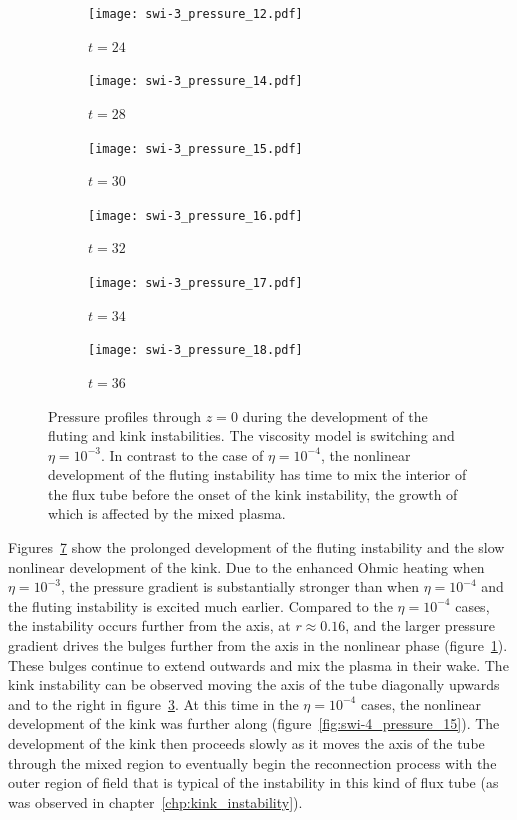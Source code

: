 \begin{figure}[t]
  \centering
    \begin{subfigure}{0.32\textwidth}
      \texttt{[image: swi-3\_pressure\_12.pdf]}
      \caption{$t=24$}
      \label{fig:swi-3_pressure_12}
    \end{subfigure}
    \hfill
    \begin{subfigure}{0.32\textwidth}
      \texttt{[image: swi-3\_pressure\_14.pdf]}
      \caption{$t=28$}
      \label{fig:swi-3_pressure_14}
    \end{subfigure}
    \hfill
    \begin{subfigure}{0.32\textwidth}
      \texttt{[image: swi-3\_pressure\_15.pdf]}
      \caption{$t=30$}
      \label{fig:swi-3_pressure_15}
    \end{subfigure}
    \hfill
    \begin{subfigure}{0.32\textwidth}
      \texttt{[image: swi-3\_pressure\_16.pdf]}
      \caption{$t=32$}
      \label{fig:swi-3_pressure_16}
    \end{subfigure}
    \hfill
    \begin{subfigure}{0.32\textwidth}
      \texttt{[image: swi-3\_pressure\_17.pdf]}
      \caption{$t=34$}
      \label{fig:swi-3_pressure_17}
    \end{subfigure}
    \hfill
    \begin{subfigure}{0.32\textwidth}
      \texttt{[image: swi-3\_pressure\_18.pdf]}
      \caption{$t=36$}
      \label{fig:swi-3_pressure_18}
    \end{subfigure}
\caption{Pressure profiles through $z=0$ during the development of the fluting and kink instabilities. The viscosity model is switching and $\eta = 10^{-3}$. In contrast to the case of $\eta=10^{-4}$, the nonlinear development of the fluting instability has time to mix the interior of the flux tube before the onset of the kink instability, the growth of which is affected by the mixed plasma.}
\label{fig:kink_pressure_slices-3}%
\end{figure}

Figures~\ref{fig:kink_pressure_slices-3} show the prolonged development of the fluting instability and the slow nonlinear development of the kink. Due to the enhanced Ohmic heating when $\eta=10^{-3}$, the pressure gradient is substantially stronger than when $\eta=10^{-4}$ and the fluting instability is excited much earlier. Compared to the $\eta=10^{-4}$ cases, the instability occurs further from the axis, at $r\approx0.16$, and the larger pressure gradient drives the bulges further from the axis in the nonlinear phase (figure~\ref{fig:swi-3_pressure_12}). These bulges continue to extend outwards and mix the plasma in their wake. The kink instability can be observed moving the axis of the tube diagonally upwards and to the right in figure~\ref{fig:swi-3_pressure_15}. At this time in the $\eta=10^{-4}$ cases, the nonlinear development of the kink was further along (figure~\ref{fig:swi-4_pressure_15}). The development of the kink then proceeds slowly as it moves the axis of the tube through the mixed region to eventually begin the reconnection process with the outer region of field that is typical of the instability in this kind of flux tube (as was observed in chapter~\ref{chp:kink_instability}).

